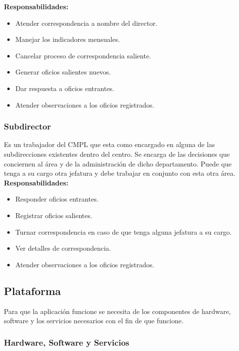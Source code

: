 \textbf{Responsabilidades:}
\begin{itemize}
	\item Atender correspondencia a nombre del director.
	\item Manejar los indicadores mensuales.
	\item Cancelar proceso de correspondencia saliente.
	\item Generar oficios salientes nuevos.
	\item Dar respuesta a oficios entrantes.
	\item Atender observaciones a los oficios registrados.
\end{itemize}

\subsubsection{Subdirector}
Es un trabajador del CMPL que esta como encargado en alguna de las subdirecciones existentes dentro del centro. Se encarga de las decisiones que conciernen al área y de la administración de dicho departamento. Puede que tenga a su cargo otra jefatura y debe trabajar en conjunto con esta otra área.\\ 

\textbf{Responsabilidades:}
\begin{itemize}
	\item Responder oficios entrantes.
	\item Registrar oficios salientes.
	\item Turnar correspondencia en caso de que tenga alguna jefatura a su cargo.
	\item Ver detalles de correspondencia.
	\item Atender observaciones a los oficios registrados.
\end{itemize}

\subsection{Plataforma}

Para que la aplicación funcione se necesita de los componentes de hardware, software y los servicios necesarios con el fin de que funcione.\\
\subsubsection{Hardware, Software y Servicios}

